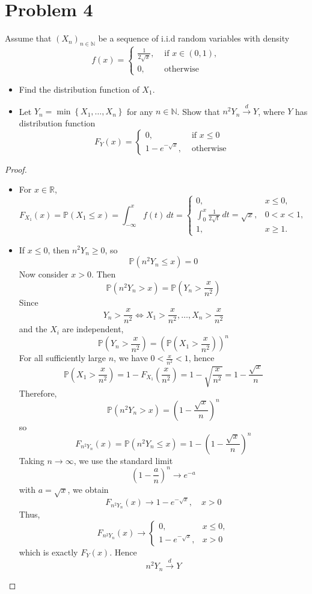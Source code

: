 \section*{Problem 4}
Assume that $\left(X_n\right)_{n \in \mathbb{N}}$ be a sequence of i.i.d random variables 
with density
$$
f(x)= 
\begin{cases}
\frac{1}{2 \sqrt{x}}, & \text { if } x \in(0,1), 
\\ 0, & \text { otherwise }
\end{cases}
$$
\begin{itemize}
    \item Find the distribution function of $X_1$.
    \item Let $Y_n=\min \left\{X_1, \ldots, X_n\right\}$ for any $n \in \mathbb{N}$.
     Show that $n^2 Y_n \xrightarrow{d} Y$, where $Y$ has distribution function
$$
F_Y(x)= 
\begin{cases}
0, & \text { if } x \leq 0 \\ 
1-e^{-\sqrt{x}}, & \text { otherwise }
\end{cases}
$$
\end{itemize}

\begin{proof}
\begin{itemize}
\item
For \(x \in \mathbb{R}\),
\[
F_{X_1}(x)=\mathbb{P}(X_1\le x)=\int_{-\infty}^x f(t)\,dt
=
\begin{cases}
0, & x\le 0,\\[1mm]
\displaystyle \int_0^x \frac{1}{2\sqrt{t}}\,dt=\sqrt{x}, & 0<x<1,\\[2mm]
1, & x\ge 1.
\end{cases}
\]

\item
If \(x\le 0\), then \(n^2Y_n\ge 0\), so
\[
\mathbb{P}(n^2Y_n\le x)=0
\]
Now consider \(x>0\). Then
\[
\mathbb{P}(n^2Y_n>x)=\mathbb{P}\left(Y_n>\frac{x}{n^2}\right)
\]
Since
\[
Y_n>\frac{x}{n^2}
 \iff  
X_1>\frac{x}{n^2},\dots,X_n>\frac{x}{n^2}
\]
and the \(X_i\) are independent,
\[
\mathbb{P}\left(Y_n>\frac{x}{n^2}\right)
=\left(\mathbb{P}\left(X_1>\frac{x}{n^2}\right)\right)^n
\]
For all sufficiently large \(n\), we have \(0<\frac{x}{n^2}<1\), hence
\[
\mathbb{P}\left(X_1>\frac{x}{n^2}\right)
=1-F_{X_1}\left(\frac{x}{n^2}\right)
=1-\sqrt{\frac{x}{n^2}}
=1-\frac{\sqrt{x}}{n}
\]
Therefore,
\[
\mathbb{P}(n^2Y_n>x)=\left(1-\frac{\sqrt{x}}{n}\right)^n
\]
so
\[
F_{n^2Y_n}(x)
=\mathbb{P}(n^2Y_n\le x)
=1-\left(1-\frac{\sqrt{x}}{n}\right)^n
\]
Taking \(n\to\infty\), we use the standard limit
\[
\left(1-\frac{a}{n}\right)^n \to e^{-a}
\]
with \(a=\sqrt{x}\), we obtain
\[
F_{n^2Y_n}(x)\to 1-e^{-\sqrt{x}}, \quad x>0
\]
Thus,
\[
F_{n^2Y_n}(x)\to
\begin{cases}
0, & x\le 0,\\
1-e^{-\sqrt{x}}, & x>0
\end{cases}
\]
which is exactly \(F_Y(x)\). Hence
\[
n^2Y_n \xrightarrow{d} Y
\]
\end{itemize}
\end{proof}



